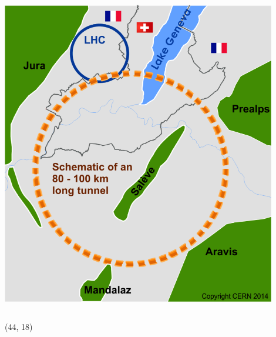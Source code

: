 \documentclass[final,xcolor={dvipsnames,svgnames,x11names,table}]{beamer}
\begin{document}
\begin{frame}
\begin{textblock}{43}
\begin{tcolorbox}[title=The Future Circular Collider Experiment (FCC)]
\begin{columns}
      \centering
      \includegraphics[width=0.9\textwidth]{Figures/cernFCC}
  \end{columns}

  \end{tcolorbox}
\end{textblock}

\begin{textblock}{39.5}(44, 18)
  \begin{tcolorbox}[title=FCCSW: Physics and Detector simulations with FCCSW]


\end{tcolorbox}
\end{textblock}
\end{frame}
\end{document}
